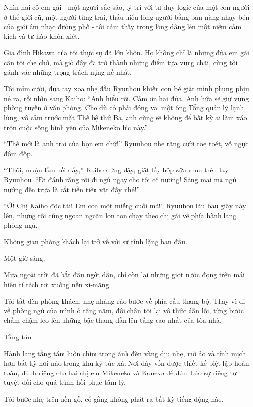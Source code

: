 \documentclass[../main.tex]{subfiles}
\begin{document}
Nhìn hai cô em gái - một người sắc sảo, lý trí với tư duy logic của một con người ở thế giới cũ, một người từng trải, thấu hiểu lòng người bằng bản năng nhạy bén của giới âm nhạc đường phố - tôi cảm thấy trong lòng dâng lên một niềm cảm kích và tự hào khôn xiết.

Gia đình Hikawa của tôi thực sự đã lớn khôn. Họ không chỉ là những đứa em gái cần tôi che chở, mà giờ đây đã trở thành những điểm tựa vững chãi, cùng tôi gánh vác những trọng trách nặng nề nhất.

Tôi mỉm cười, đưa tay xoa nhẹ đầu Ryuuhou khiến con bé giật mình phụng phịu né ra, rồi nhìn sang Kaiho: ``Anh hiểu rồi. Cảm ơn hai đứa. Anh hứa sẽ giữ vững phòng tuyến ở văn phòng. Cho dù có phải đóng vai một ông Tổng quản lý lạnh lùng, vô cảm trước mặt Thế hệ thứ Ba, anh cũng sẽ không để bất kỳ ai làm xáo trộn cuộc sống bình yên của Mikeneko lúc này.''

``Thế mới là anh trai của bọn em chứ!'' Ryuuhou nhe răng cười toe toét, vỗ ngực đôm đốp.

``Thôi, muộn lắm rồi đấy,'' Kaiho đứng dậy, giật lấy hộp sữa chua trên tay Ryuuhou. ``Đi đánh răng rồi đi ngủ ngay cho tôi cô nương! Sáng mai mà ngủ nướng đến trưa là cắt tiền tiêu vặt đấy nhé!''

``Ớ! Chị Kaiho độc tài! Em còn một miếng cuối mà!'' Ryuuhou làu bàu giãy nảy lên, nhưng rồi cũng ngoan ngoãn lon ton chạy theo chị gái về phía hành lang phòng ngủ.

Không gian phòng khách lại trở về với sự tĩnh lặng ban đầu.

\ct

Một giờ sáng.

Mưa ngoài trời đã bắt đầu ngớt dần, chỉ còn lại những giọt nước đọng trên mái hiên tí tách rơi xuống nền xi-măng.

Tôi tắt đèn phòng khách, nhẹ nhàng rảo bước về phía cầu thang bộ. Thay vì đi về phòng ngủ của mình ở tầng năm, đôi chân tôi lại vô thức dẫn lối, từng bước chầm chậm leo lên những bậc thang dẫn lên tầng cao nhất của tòa nhà.

Tầng tám.

Hành lang tầng tám luôn chìm trong ánh đèn vàng dịu nhẹ, mờ ảo và tĩnh mịch hơn bất kỳ nơi nào trong khu ký túc xá. Nơi đây vốn được thiết kế biệt lập hoàn toàn, dành riêng cho hai chị em Mikeneko và Koneko để đảm bảo sự riêng tư tuyệt đối cho quá trình hồi phục tâm lý.

Tôi bước nhẹ trên nền gỗ, cố gắng không phát ra bất kỳ tiếng động nào.
\end{document}
